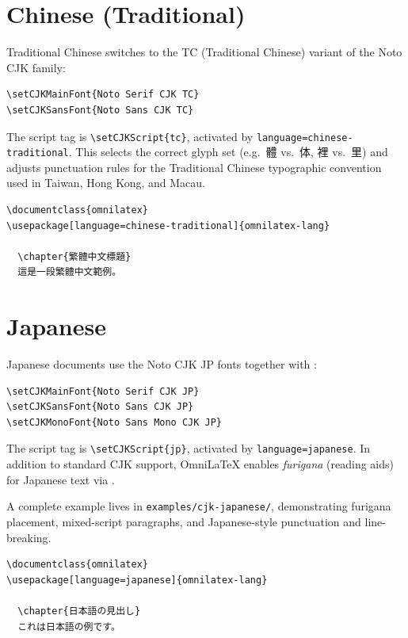 \section{Chinese (Traditional)}

Traditional Chinese switches to the TC (Traditional Chinese) variant of the
Noto CJK family:

\begin{verbatim}
\setCJKMainFont{Noto Serif CJK TC}
\setCJKSansFont{Noto Sans CJK TC}
\end{verbatim}

The script tag is \verb|\setCJKScript{tc}|, activated by
\texttt{language=chinese-traditional}.  This selects the correct glyph set
(e.g.\ 體 vs.\ 体, 裡 vs.\ 里) and adjusts punctuation rules for the
Traditional Chinese typographic convention used in Taiwan, Hong Kong, and
Macau.

\begin{verbatim}
\documentclass{omnilatex}
\usepackage[language=chinese-traditional]{omnilatex-lang}

  \chapter{繁體中文標題}
  這是一段繁體中文範例。

\end{verbatim}

\section{Japanese}

Japanese documents use the Noto CJK JP fonts together with :

\begin{verbatim}
\setCJKMainFont{Noto Serif CJK JP}
\setCJKSansFont{Noto Sans CJK JP}
\setCJKMonoFont{Noto Sans Mono CJK JP}
\end{verbatim}

The script tag is \verb|\setCJKScript{jp}|, activated by
\texttt{language=japanese}.  In addition to standard CJK support,
OmniLaTeX enables \emph{furigana} (reading aids) for Japanese text via
.

A complete example lives in \texttt{examples/cjk-japanese/}, demonstrating
furigana placement, mixed-script paragraphs, and Japanese-style punctuation
and line-breaking.

\begin{verbatim}
\documentclass{omnilatex}
\usepackage[language=japanese]{omnilatex-lang}

  \chapter{日本語の見出し}
  これは日本語の例です。

\end{verbatim}

